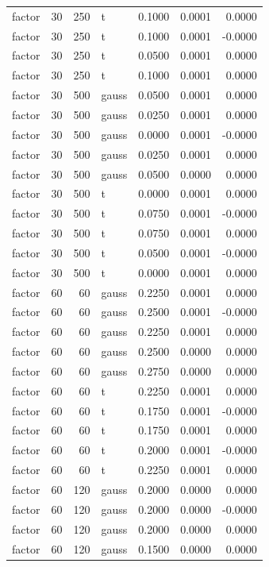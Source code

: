 \begin{tabular}{lrrlrrr}
factor & 30 & 250 & t & 0.1000 & 0.0001 & 0.0000 \\
factor & 30 & 250 & t & 0.1000 & 0.0001 & -0.0000 \\
factor & 30 & 250 & t & 0.0500 & 0.0001 & 0.0000 \\
factor & 30 & 250 & t & 0.1000 & 0.0001 & 0.0000 \\
factor & 30 & 500 & gauss & 0.0500 & 0.0001 & 0.0000 \\
factor & 30 & 500 & gauss & 0.0250 & 0.0001 & 0.0000 \\
factor & 30 & 500 & gauss & 0.0000 & 0.0001 & -0.0000 \\
factor & 30 & 500 & gauss & 0.0250 & 0.0001 & 0.0000 \\
factor & 30 & 500 & gauss & 0.0500 & 0.0000 & 0.0000 \\
factor & 30 & 500 & t & 0.0000 & 0.0001 & 0.0000 \\
factor & 30 & 500 & t & 0.0750 & 0.0001 & -0.0000 \\
factor & 30 & 500 & t & 0.0750 & 0.0001 & 0.0000 \\
factor & 30 & 500 & t & 0.0500 & 0.0001 & -0.0000 \\
factor & 30 & 500 & t & 0.0000 & 0.0001 & 0.0000 \\
factor & 60 & 60 & gauss & 0.2250 & 0.0001 & 0.0000 \\
factor & 60 & 60 & gauss & 0.2500 & 0.0001 & -0.0000 \\
factor & 60 & 60 & gauss & 0.2250 & 0.0001 & 0.0000 \\
factor & 60 & 60 & gauss & 0.2500 & 0.0000 & 0.0000 \\
factor & 60 & 60 & gauss & 0.2750 & 0.0000 & 0.0000 \\
factor & 60 & 60 & t & 0.2250 & 0.0001 & 0.0000 \\
factor & 60 & 60 & t & 0.1750 & 0.0001 & -0.0000 \\
factor & 60 & 60 & t & 0.1750 & 0.0001 & 0.0000 \\
factor & 60 & 60 & t & 0.2000 & 0.0001 & -0.0000 \\
factor & 60 & 60 & t & 0.2250 & 0.0001 & 0.0000 \\
factor & 60 & 120 & gauss & 0.2000 & 0.0000 & 0.0000 \\
factor & 60 & 120 & gauss & 0.2000 & 0.0000 & -0.0000 \\
factor & 60 & 120 & gauss & 0.2000 & 0.0000 & 0.0000 \\
factor & 60 & 120 & gauss & 0.1500 & 0.0000 & 0.0000 \\

\end{tabular}
